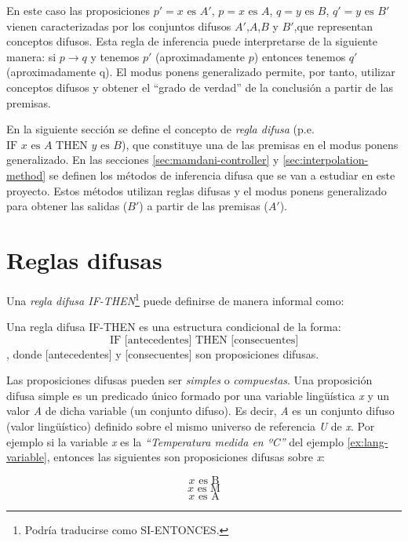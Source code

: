 En este caso las proposiciones $p'=x \text{ es } A'$, $p=x \text{ es } A$, $q=y \text{ es } B$, $q'=y \text{ es } B'$ vienen caracterizadas por los conjuntos difusos $A'$,$A$,$B$ y $B'$,que representan conceptos difusos. Esta regla de inferencia puede interpretarse de la siguiente manera: si $p \to q$ y tenemos $p'$ (aproximadamente $p$) entonces tenemos $q'$ (aproximadamente q). El modus ponens generalizado permite, por tanto, utilizar conceptos difusos y obtener el ``grado de verdad'' de la conclusión a partir de las premisas.

En la siguiente sección se define el concepto de \emph{regla difusa} (p.e. $\text{IF } x \text{ es } A \text{ THEN } y \text{ es } B$), que constituye una de las premisas en el modus ponens generalizado. En las secciones \ref{sec:mamdani-controller} y \ref{sec:interpolation-method} se definen los métodos de inferencia difusa que se van a estudiar en este proyecto. Estos métodos utilizan reglas difusas y el modus ponens generalizado para obtener las salidas ($B'$) a partir de las premisas ($A'$).

\section{Reglas difusas}
Una \emph{regla difusa IF-THEN}\footnote{Podría traducirse como SI-ENTONCES.} puede definirse de manera informal como:

\begin{definition}
Una regla difusa IF-THEN es una estructura condicional de la forma:
\begin{equation}
\text{IF [antecedentes] THEN [consecuentes]}
\end{equation},
donde [antecedentes] y [consecuentes] son proposiciones difusas.
\end{definition}

Las proposiciones difusas pueden ser \emph{simples} o \emph{compuestas}. Una proposición difusa simple es un predicado único formado por una variable lingüística \emph{x} y un valor \emph{A} de dicha variable (un conjunto difuso). Es decir, \emph{A} es un conjunto difuso (valor lingüístico) definido sobre el mismo universo de referencia \emph{U} de \emph{x}. Por ejemplo si la variable \emph{x} es la \emph{``Temperatura medida en ºC''} del ejemplo \ref{ex:lang-variable}, entonces las siguientes son proposiciones difusas sobre \emph{x}:

\begin{equation}
\text{$x$ es B}
\end{equation}
\begin{equation}
\text{$x$ es M}
\end{equation}
\begin{equation}
\text{$x$ es A}
\end{equation}

